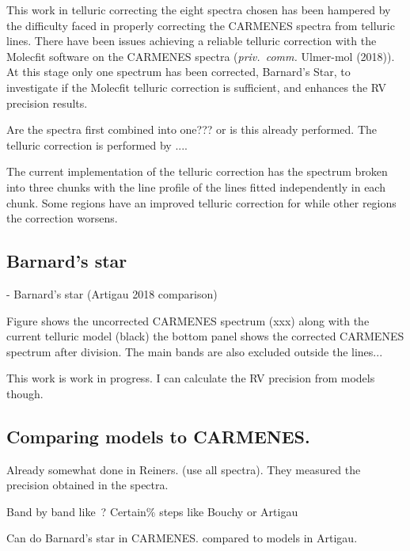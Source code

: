 This work in telluric correcting the eight spectra chosen has been hampered by the difficulty faced in properly correcting the CARMENES spectra from telluric lines.
There have been issues achieving a reliable telluric correction with the Molecfit software on the {CARMENES} spectra (\emph{priv.\ comm.} Ulmer-mol (2018)).
At this stage only one spectrum has been corrected, Barnard's Star, to investigate if the Molecfit telluric correction is sufficient, and enhances the {RV} precision results.

Are the spectra first combined into one??? or is this already performed.
The telluric correction is performed by ....


The current implementation of the telluric correction has the spectrum broken into three chunks with the line profile of the lines fitted independently in each chunk.
Some regions have an improved telluric correction for while other regions the correction worsens.

\subsection{Barnard's star}
- Barnard's star (Artigau 2018 comparison)

Figure \citep{} shows the uncorrected CARMENES spectrum (xxx) along with the current telluric model (black) the bottom panel shows the corrected CARMENES spectrum after division.
The main \nir{}  bands are also excluded outside the lines...


This work is work in progress.
{I can calculate the {RV} precision from models though.}




\subsection{Comparing models to {CARMENES}.}
Already somewhat done in Reiners.
(use all spectra).
They measured the precision obtained in the spectra.

Band by band like~\citet{figueira_radial_2016}?
Certain\% steps like Bouchy or Artigau


Can do Barnard's star in {CARMENES}.
 compared to models in Artigau.


